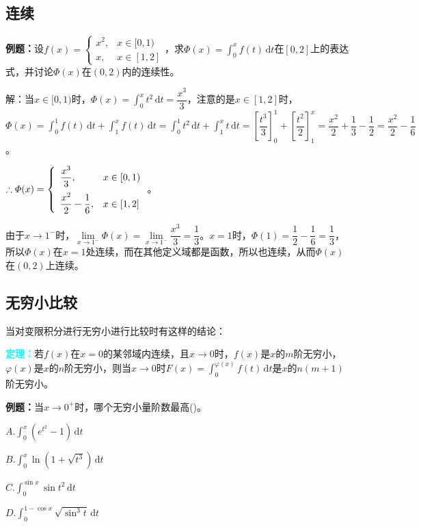 \documentclass[UTF8, 12pt]{ctexart}
\begin{document}
\subsection{连续}

\textbf{例题：}设$f(x)=\left\{\begin{array}{ll}
    x^2, & x\in[0,1) \\
    x, & x\in[1,2]
\end{array}\right.$，求$\varPhi(x)=\int_0^xf(t)\,\textrm{d}t$在$[0,2]$上的表达式，并讨论$\varPhi(x)$在$(0,2)$内的连续性。

解：当$x\in[0,1)$时，$\varPhi(x)=\int_0^xt^2\,\textrm{d}t=\dfrac{x^3}{3}$，注意的是$x\in[1,2]$时，$\varPhi(x)=\int_0^1f(t)\,\textrm{d}t+\int_1^xf(t)\,\textrm{d}t=\int_0^1t^2\,\textrm{d}t+\int_1^xt\,\textrm{d}t=\left[\dfrac{t^3}{3}\right]_0^1+\left[\dfrac{t^2}{2}\right]_1^x=\dfrac{x^2}{2}+\dfrac{1}{3}-\dfrac{1}{2}=\dfrac{x^2}{2}-\dfrac{1}{6}$。

$\therefore\varPhi(x)=\left\{\begin{array}{ll}
    \dfrac{x^3}{3}, & x\in[0,1) \medskip \\
    \dfrac{x^2}{2}-\dfrac{1}{6}, & x\in[1,2]
\end{array}\right.$。

由于$x\to1^-$时，$\lim\limits_{x\to1^-}\varPhi(x)=\lim\limits_{x\to1^-}\dfrac{x^3}{3}=\dfrac{1}{3}$。$x=1$时，$\varPhi(1)=\dfrac{1}{2}-\dfrac{1}{6}=\dfrac{1}{3}$，所以$\varPhi(x)$在$x=1$处连续，而在其他定义域都是函数，所以也连续，从而$\varPhi(x)$在$(0,2)$上连续。

\subsection{无穷小比较}

当对变限积分进行无穷小进行比较时有这样的结论：

\textcolor{aqua}{\textbf{定理：}}若$f(x)$在$x=0$的某邻域内连续，且$x\to0$时，$f(x)$是$x$的$m$阶无穷小，$\varphi(x)$是$x$的$n$阶无穷小，则当$x\to0$时$F(x)=\int_0^{\varphi(x)}f(t)\,\textrm{d}t$是$x$的$n(m+1)$阶无穷小。

\textbf{例题：}当$x\to0^+$时，哪个无穷小量阶数最高()。

$A.\int_0^x(e^{t^2}-1)\,\textrm{d}t$

$B.\int_0^x\ln(1+\sqrt{t^3})\,\textrm{d}t$

$C.\int_0^{\sin x}\sin t^2\,\textrm{d}t$

$D.\int_0^{1-\cos x}\sqrt{\sin^3t}\,\textrm{d}t$
\end{document}
